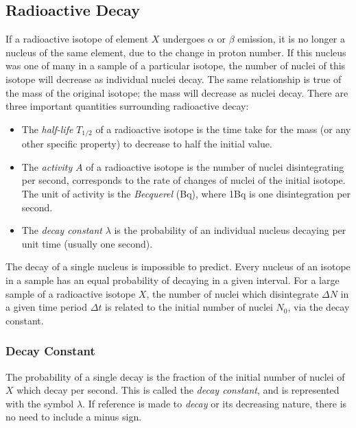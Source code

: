 \documentclass[12pt]{article}
\begin{document}
\subsection{Radioactive Decay}
\label{sec:orgbbb178f}

If a radioactive isotope of element \(X\) undergoes \(\alpha\) or \(\beta\) emission, it is no longer a nucleus of the same element, due to the change in proton number. If this nucleus was one of many in a sample of a particular isotope, the number of nuclei of this isotope will decrease as individual nuclei decay. The same relationship is true of the mass of the original isotope; the mass will decrease as nuclei decay. There are three important quantities surrounding radioactive decay:

\begin{itemize}
\item The \emph{half-life} \(T_{1/2}\) of a radioactive isotope is the time take for the mass (or any other specific property) to decrease to half the initial value.

\item The \emph{activity} \(A\) of a radioactive isotope is the number of nuclei disintegrating per second, corresponds to the rate of changes of nuclei of the initial isotope. The unit of activity is the \emph{Becquerel} (Bq), where 1Bq is one disintegration per second.

\item The \emph{decay constant} \(\lambda\) is the probability of an individual nucleus decaying per unit time (usually one second).
\end{itemize}

The decay of a single nucleus is impossible to predict. Every nucleus of an isotope in a sample has an equal probability of decaying in a given interval. For a large sample of a radioactive isotope \(X\), the number of nuclei which disintegrate \(\Delta N\) in a given time period \(\Delta t\) is related to the initial number of nuclei \(N_0\), via the decay constant.

\subsubsection{Decay Constant}
\label{sec:orge098437}

The probability of a single decay is the fraction of the initial number of nuclei of \(X\) which decay per second. This is called the \emph{decay constant}, and is represented with the symbol \(\lambda\). If reference is made to \emph{decay} or its decreasing nature, there is no need to include a minus sign.
\end{document}
